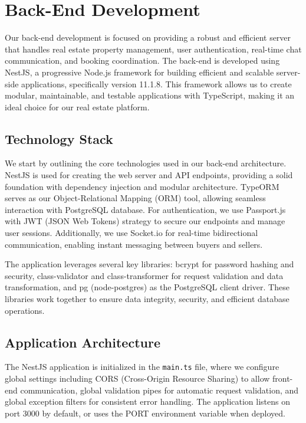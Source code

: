 \section{Back-End Development}

Our back-end development is focused on providing a robust and efficient server that handles real estate property management, user authentication, real-time chat communication, and booking coordination. The back-end is developed using NestJS, a progressive Node.js framework for building efficient and scalable server-side applications, specifically version 11.1.8. This framework allows us to create modular, maintainable, and testable applications with TypeScript, making it an ideal choice for our real estate platform.

\subsection{Technology Stack}

We start by outlining the core technologies used in our back-end architecture. NestJS is used for creating the web server and API endpoints, providing a solid foundation with dependency injection and modular architecture. TypeORM serves as our Object-Relational Mapping (ORM) tool, allowing seamless interaction with PostgreSQL database. For authentication, we use Passport.js with JWT (JSON Web Tokens) strategy to secure our endpoints and manage user sessions. Additionally, we use Socket.io for real-time bidirectional communication, enabling instant messaging between buyers and sellers.

The application leverages several key libraries: bcrypt for password hashing and security, class-validator and class-transformer for request validation and data transformation, and pg (node-postgres) as the PostgreSQL client driver. These libraries work together to ensure data integrity, security, and efficient database operations.

\subsection{Application Architecture}

The NestJS application is initialized in the \texttt{main.ts} file, where we configure global settings including CORS (Cross-Origin Resource Sharing) to allow front-end communication, global validation pipes for automatic request validation, and global exception filters for consistent error handling. The application listens on port 3000 by default, or uses the PORT environment variable when deployed.

